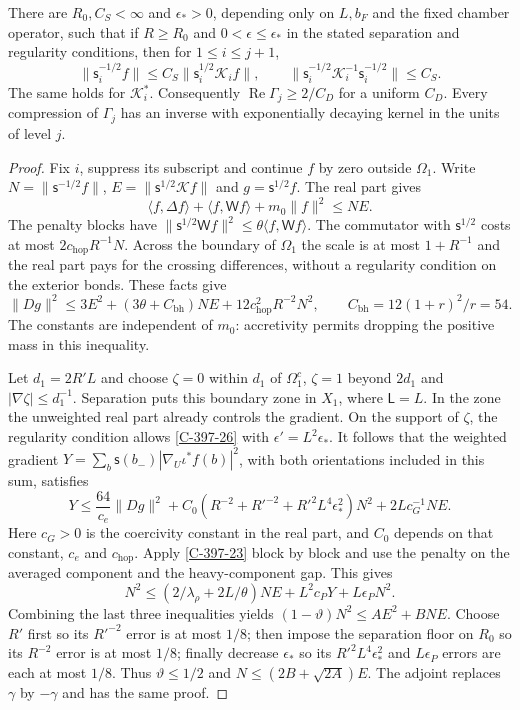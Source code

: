 \documentclass[11pt,letterpaper,reqno]{amsart}
\makeatletter
\theoremstyle{definition}
\newcommand{\ms@minorstart}{%
  \pushQED{\qed}\renewcommand{\qedsymbol}{$\blacksquare$}}
\newenvironment{proposition}[1][]{\ms@minorstart\ms@proposition[#1]}
  {\popQED\endms@proposition}
\theoremstyle{remark}
\makeatother
\begin{document}
\begin{proposition}[Weighted energy and fluctuation accretivity]
\label{C-397-28}
There are $R_0,C_S<\infty$ and $\epsilon_*>0$, depending only on
$L,b_F$ and the fixed chamber operator, such that if $R\ge R_0$
and $0<\epsilon\le\epsilon_*$ in the stated separation and
regularity conditions, then for $1\le i\le j+1$,
\[
 \|\mathsf s_i^{-1/2}f\|\le
 C_S\|\mathsf s_i^{1/2}\mathcal K_if\|,
 \qquad
 \|\mathsf s_i^{-1/2}\mathcal K_i^{-1}
                         \mathsf s_i^{-1/2}\|\le C_S.
\]
The same holds for $\mathcal K_i^*$.  Consequently
$\operatorname{Re}\Gamma_j\ge2/C_D$ for a uniform $C_D$.
Every compression of $\Gamma_j$ has an inverse with exponentially
decaying kernel in the units of level $j$.
\end{proposition}

\begin{proof}
Fix $i$, suppress its subscript and continue $f$ by zero outside
$\Omega_1$.  Write
$N=\|\mathsf s^{-1/2}f\|$, $E=\|\mathsf s^{1/2}\mathcal Kf\|$
and $g=\mathsf s^{1/2}f$.  The real part gives
\[
 \langle f,\Delta f\rangle+\langle f,\mathsf Wf\rangle
                         +m_0\|f\|^2\le NE.
\]
The penalty blocks have
$\|\mathsf s^{1/2}\mathsf Wf\|^2
\le\theta\langle f,\mathsf Wf\rangle$.
The commutator with $\mathsf s^{1/2}$ costs at most
$2c_{\mathrm{hop}}R^{-1}N$.
Across the boundary of $\Omega_1$ the scale is at most
$1+R^{-1}$ and the real part pays for the crossing differences,
without a regularity condition on the exterior bonds.  These facts
give
\[
 \|Dg\|^2\le3E^2+(3\theta+C_{\mathrm{bh}})NE
                           +12c_{\mathrm{hop}}^2R^{-2}N^2,
 \qquad C_{\mathrm{bh}}=12(1+r)^2/r=54.
\]
The constants are independent of $m_0$: accretivity permits dropping the positive
mass in this inequality.

Let $d_1=2R'L$ and choose $\zeta=0$ within $d_1$ of
$\Omega_1^c$, $\zeta=1$ beyond $2d_1$ and
$|\nabla\zeta|\le d_1^{-1}$.  Separation puts this boundary zone
in $X_1$, where $\mathsf L=L$.  In the zone the unweighted real
part already controls the gradient.  On the support of $\zeta$,
the regularity condition allows \cref{C-397-26} with
$\epsilon'=L^2\epsilon_*$.  It follows that the weighted gradient
$Y=\sum_b\mathsf s(b_-)|\nabla_U\iota^*f(b)|^2$, with both
orientations included in this sum, satisfies
\[
 Y\le\frac{64}{c_e}\|Dg\|^2+C_0
       (R^{-2}+R'^{-2}+R'^2L^4\epsilon_*^2)N^2
                          +2Lc_G^{-1}NE.
\]
Here $c_G>0$ is the coercivity constant in the real part, and
$C_0$ depends on that constant, $c_e$ and $c_{\mathrm{hop}}$.
Apply \cref{C-397-23} block by block and use the penalty on the
averaged component and the heavy-component gap.  This gives
\[
 N^2\le(2/\lambda_\rho+2L/\theta)NE
                             +L^2c_PY+L\epsilon_PN^2.
\]
Combining the last three inequalities yields
$(1-\vartheta)N^2\le A E^2+BNE$.
Choose $R'$ first so its $R'^{-2}$ error is at most $1/8$;
then impose the separation floor on $R_0$ so its $R^{-2}$
error is at most $1/8$; finally decrease $\epsilon_*$ so its
$R'^2L^4\epsilon_*^2$ and $L\epsilon_P$ errors are each at
most $1/8$.  Thus $\vartheta\le1/2$ and
$N\le(2B+\sqrt{2A})E$.  The adjoint replaces $\gamma$ by
$-\gamma$ and has the same proof.


\end{proof}
\end{document}
